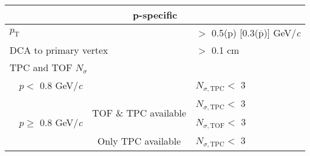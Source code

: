 \documentclass[ALICE,manyauthors]{cernphprep}
\newcommand{\Lam}{$\Lambda$\xspace}
\begin{document}
\begin{table}[htbp]
\begin{tabular}{lc|c|l}
   
   \multicolumn{4}{c}{p-specific} \\
   \hline
   \multicolumn{3}{l|}{$p_{\mathrm{T}}$} & $ > $ 0.5(p) [0.3($\overline{\mathrm{p}}$)] GeV/\textit{c} \\
   \hline
   \multicolumn{3}{l|}{DCA to primary vertex} & $>$ 0.1 cm \\
   \hline
   \multicolumn{4}{l}{TPC and TOF $N_{\sigma}$} \\
   \cline{2-4}
    & \multicolumn{1}{c}{$p <$ 0.8 GeV/\textit{c}} & & $N_{\sigma, \mathrm{TPC}} <$ 3 \\
   \cline{2-4}
    & \multicolumn{1}{c}{\multirow{3}{*}{$p \geq$ 0.8 GeV/\textit{c}}} &  \multirow{2}{*}{TOF \& TPC available} & $N_{\sigma, \mathrm{TPC}} <$ 3 \\
    & \multicolumn{2}{c|}{} & $N_{\sigma, \mathrm{TOF}} <$ 3 \\
   \cline{3-4}
    & \multicolumn{1}{c}{} & Only TPC available & $N_{\sigma, \mathrm{TPC}} <$ 3 \\
   \hline   
  \end{tabular}
 \label{tab:LamCuts} 
\end{table}
\end{document}
